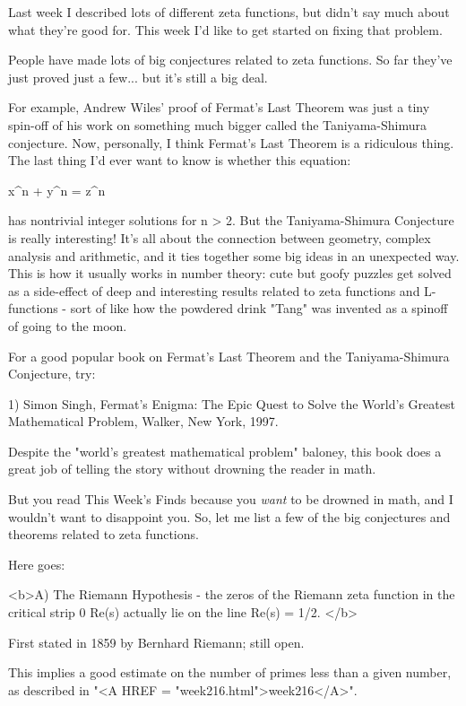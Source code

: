 


Last week I described lots of different zeta functions, but didn't say much 
about what they're good for.   This week I'd like to get started on fixing 
that problem.  

People have made lots of big conjectures related to zeta functions.  
So far they've just proved just a few... but it's still a big deal.

For example, Andrew Wiles' proof of Fermat's Last Theorem was just 
a tiny spin-off of his work on something much bigger called the 
Taniyama-Shimura conjecture.  Now, personally, I think Fermat's Last 
Theorem is a ridiculous thing.  The last thing I'd ever want to know is 
whether this equation:

x^{n} + y^{n} = z^{n}

has nontrivial integer solutions for n > 2.  But the Taniyama-Shimura
Conjecture is really interesting!   It's all about the connection between 
geometry, complex analysis and arithmetic, and it ties together some big 
ideas in an unexpected way.  This is how it usually works in number theory: 
cute but goofy puzzles get solved as a side-effect of deep and interesting 
results related to zeta functions and L-functions - sort of like how the 
powdered drink "Tang" was invented as a spinoff of going to the moon.

For a good popular book on Fermat's Last Theorem and the Taniyama-Shimura
Conjecture, try:

1) Simon Singh, Fermat's Enigma: The Epic Quest to Solve the World's 
Greatest Mathematical Problem, Walker, New York, 1997.

Despite the "world's greatest mathematical problem" baloney, this 
book does 
a great job of telling the story without drowning the reader in math.

But you read This Week's Finds because you \emph{want} to be drowned in math, 
and I wouldn't want to disappoint you.  So, let me list a few of the big 
conjectures and theorems related to zeta functions.

Here goes:


<b>A) The Riemann Hypothesis - the zeros of the Riemann zeta function in 
the critical strip
0 \le  Re(s) 
actually lie on the line Re(s) = 1/2.  </b>

First stated in 1859 by Bernhard Riemann; still open.

This implies a good estimate on the number of primes less than a given 
number, as described in "<A HREF = "week216.html">week216</A>".

